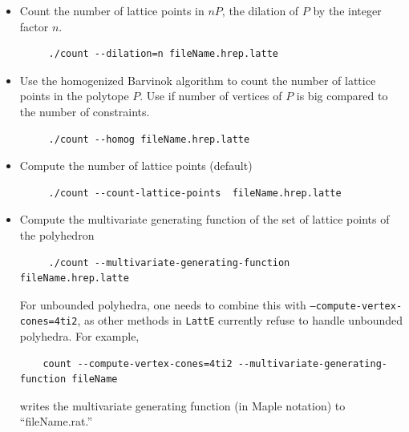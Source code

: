 \documentclass{article}
\newcommand{\latte}{{\tt LattE}\xspace}
\begin{document}
\begin{itemize}
\item Count the number of lattice points in $nP$, the dilation of $P$ by the integer factor $n$.
	\begin{verbatim}
     ./count --dilation=n fileName.hrep.latte
	\end{verbatim} 

\item Use the homogenized Barvinok algorithm \cite{latte3} to count  the number of lattice points in the polytope $P$. Use if number of vertices of $P$ is big compared to the number of constraints. 
	\begin{verbatim}
     ./count --homog fileName.hrep.latte
	\end{verbatim} 
\item Compute the number of lattice points (default)
	\begin{verbatim}
     ./count --count-lattice-points  fileName.hrep.latte
	\end{verbatim} 
\item Compute the multivariate generating function of the set of lattice points of the polyhedron
	\begin{verbatim}
     ./count --multivariate-generating-function  fileName.hrep.latte
	\end{verbatim} 
For unbounded polyhedra, one needs to combine
  this with {\tt --compute-vertex-cones=4ti2}, as other methods in \latte currently refuse to handle unbounded polyhedra. For example, 
	\begin{verbatim}
  	count --compute-vertex-cones=4ti2 --multivariate-generating-function fileName
	\end{verbatim}
  writes the multivariate generating function (in Maple notation) to ``fileName.rat.''
	
	
	

\end{itemize}
\end{document}
